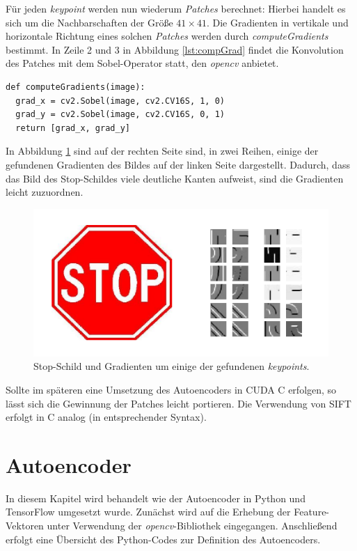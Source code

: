 Für jeden \textit{keypoint} werden nun wiederum \textit{Patches} berechnet: Hierbei handelt es sich um die Nachbarschaften der Größe $41 \times 41$. Die Gradienten in vertikale und horizontale Richtung eines solchen \textit{Patches} werden durch \textit{computeGradients} bestimmt. In Zeile 2 und 3 in Abbildung \ref{lst:compGrad} findet die Konvolution des Patches mit dem Sobel-Operator statt, den \textit{opencv} anbietet.

\begin{lstlisting}
def computeGradients(image):
  grad_x = cv2.Sobel(image, cv2.CV16S, 1, 0)
  grad_y = cv2.Sobel(image, cv2.CV16S, 0, 1)
  return [grad_x, grad_y]
\end{lstlisting}

In Abbildung \ref{img:gradients} sind auf der rechten Seite sind, in zwei Reihen, einige der gefundenen Gradienten des Bildes auf der linken Seite dargestellt. Dadurch, dass das Bild des Stop-Schildes viele deutliche Kanten aufweist, sind die Gradienten leicht zuzuordnen.

\begin{figure}
	\centering
	\includegraphics[scale=0.65]{images/gradients_patch.png}
	\caption{Stop-Schild und Gradienten um einige der gefundenen \textit{keypoints}.}
	\label{img:gradients}
\end{figure}

Sollte im späteren eine Umsetzung des Autoencoders in CUDA C erfolgen, so lässt sich die Gewinnung der Patches leicht portieren. Die Verwendung von SIFT erfolgt in C analog (in entsprechender Syntax).

\section{Autoencoder}

In diesem Kapitel wird behandelt wie der Autoencoder in Python und TensorFlow umgesetzt wurde. Zunächst wird auf die Erhebung der Feature-Vektoren unter Verwendung der \textit{opencv}-Bibliothek eingegangen. Anschließend erfolgt eine Übersicht des Python-Codes zur Definition des Autoencoders.

